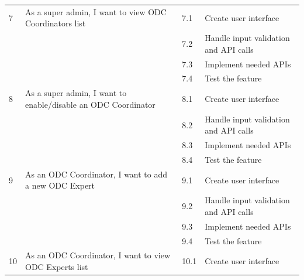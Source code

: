 \begin{longtable}{|p{1cm}|p{7cm}|p{1cm}|p{7cm}|}
    7                               & As a super admin, I want to view ODC Coordinators list        & 7.1         & Create user interface                 \\ \cline{3-4}
                                    &                                                               & 7.2         & Handle input validation and API calls \\ \cline{3-4}
                                    &                                                               & 7.3         & Implement needed APIs                 \\ \cline{3-4}
                                    &                                                               & 7.4         & Test the feature                      \\ \hline
    8                               & As a super admin, I want to enable/disable an ODC Coordinator & 8.1         & Create user interface                 \\ \cline{3-4}
                                    &                                                               & 8.2         & Handle input validation and API calls \\ \cline{3-4}
                                    &                                                               & 8.3         & Implement needed APIs                 \\ \cline{3-4}
                                    &                                                               & 8.4         & Test the feature                      \\ \hline
    9                               & As an ODC Coordinator, I want to add a new ODC Expert         & 9.1         & Create user interface                 \\ \cline{3-4}
                                    &                                                               & 9.2         & Handle input validation and API calls \\ \cline{3-4}
                                    &                                                               & 9.3         & Implement needed APIs                 \\ \cline{3-4}
                                    &                                                               & 9.4         & Test the feature                      \\ \hline
    10                              & As an ODC Coordinator, I want to view ODC Experts list        & 10.1        & Create user interface                 \\ \cline{3-4}

\end{longtable}
